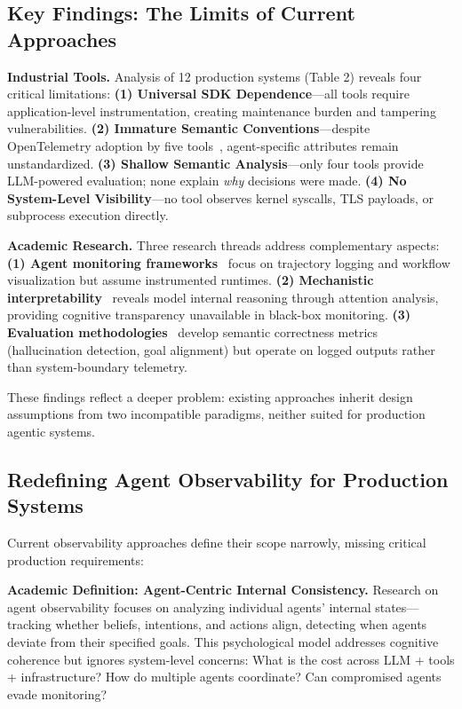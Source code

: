 \documentclass[sigplan,screen,9pt]{acmart}
\begin{document}
\subsection{Key Findings: The Limits of Current Approaches}

\textbf{Industrial Tools.} Analysis of 12 production systems (Table 2) reveals four critical limitations: \textbf{(1) Universal SDK Dependence}—all tools require application-level instrumentation, creating maintenance burden and tampering vulnerabilities. \textbf{(2) Immature Semantic Conventions}—despite OpenTelemetry adoption by five tools~\cite{Liu2025OTel}, agent-specific attributes remain unstandardized. \textbf{(3) Shallow Semantic Analysis}—only four tools provide LLM-powered evaluation; none explain \emph{why} decisions were made. \textbf{(4) No System-Level Visibility}—no tool observes kernel syscalls, TLS payloads, or subprocess execution directly.

\textbf{Academic Research.} Three research threads address complementary aspects: \textbf{(1) Agent monitoring frameworks}~\cite{Rombaut2025Watson,Dong2024AgentOps} focus on trajectory logging and workflow visualization but assume instrumented runtimes. \textbf{(2) Mechanistic interpretability}~\cite{Kim2025AgenticInterp} reveals model internal reasoning through attention analysis, providing cognitive transparency unavailable in black-box monitoring. \textbf{(3) Evaluation methodologies}~\cite{Moshkovich2025Pipeline} develop semantic correctness metrics (hallucination detection, goal alignment) but operate on logged outputs rather than system-boundary telemetry.

These findings reflect a deeper problem: existing approaches inherit design assumptions from two incompatible paradigms, neither suited for production agentic systems.

\subsection{Redefining Agent Observability for Production Systems}

Current observability approaches define their scope narrowly, missing critical production requirements:

\textbf{Academic Definition: Agent-Centric Internal Consistency.} Research on agent observability focuses on analyzing individual agents' internal states—tracking whether beliefs, intentions, and actions align, detecting when agents deviate from their specified goals. This psychological model addresses cognitive coherence but ignores system-level concerns: What is the cost across LLM + tools + infrastructure? How do multiple agents coordinate? Can compromised agents evade monitoring?
\end{document}
